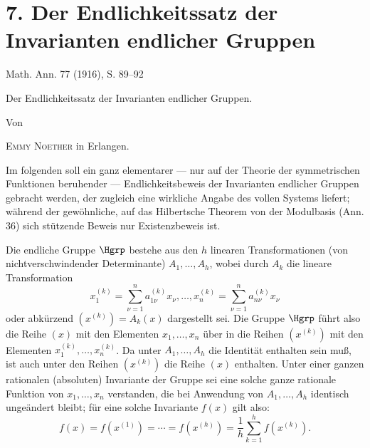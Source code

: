 \section*{7. Der Endlichkeitssatz der Invarianten endlicher Gruppen}
\begin{center}
Math. Ann. 77 (1916), S. 89--92
\end{center}

\begin{center}
{\Large Der Endlichkeitssatz der Invarianten endlicher Gruppen.}\par
\vspace{1.2em}
Von\par
\vspace{0.8em}
{\scshape Emmy Noether} in Erlangen.
\end{center}

Im folgenden soll ein ganz elementarer --- nur auf der Theorie der symmetrischen Funktionen beruhender --- Endlichkeitsbeweis der Invarianten endlicher Gruppen gebracht werden, der zugleich eine wirkliche Angabe des vollen Systems liefert; während der gewöhnliche, auf das Hilbertsche Theorem von der Modulbasis (Ann. 36) sich stützende Beweis nur Existenzbeweis ist.

Die endliche Gruppe $\Hgrp$ bestehe aus den $h$ linearen Transformationen (von nichtverschwindender Determinante) $A_1,\ldots,A_h$, wobei durch $A_k$ die lineare Transformation
\[
  x_1^{(k)}=\sum_{\nu=1}^{n}a_{1\nu}^{(k)}x_\nu,\ldots,
  x_n^{(k)}=\sum_{\nu=1}^{n}a_{n\nu}^{(k)}x_\nu
\]
oder abkürzend $(x^{(k)})=A_k(x)$ dargestellt sei. Die Gruppe $\Hgrp$ führt also die Reihe $(x)$ mit den Elementen $x_1,\ldots,x_n$ über in die Reihen $(x^{(k)})$ mit den Elementen $x_1^{(k)},\ldots,x_n^{(k)}$. Da unter $A_1,\ldots,A_h$ die Identität enthalten sein muß, ist auch unter den Reihen $(x^{(k)})$ die Reihe $(x)$ enthalten. Unter einer ganzen rationalen (absoluten) Invariante der Gruppe sei eine solche ganze rationale Funktion von $x_1,\ldots,x_n$ verstanden, die bei Anwendung von $A_1,\ldots,A_h$ identisch ungeändert bleibt; für eine solche Invariante $f(x)$ gilt also:
\begin{equation}
  f(x)=f(x^{(1)})=\cdots=f(x^{(h)})=
  \frac1h\sum_{k=1}^{h}f(x^{(k)}).
\tag{1}
\end{equation}


